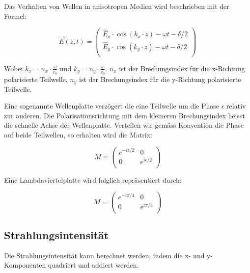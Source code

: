 Das Verhalten von Wellen  in anisotropen Medien wird beschrieben mit der Formel:

\begin{equation}
    \vec{E}(z,t) = \begin{pmatrix}
        \hat{E}_x\cdot\cos(k_x \cdot z) - \omega t - \delta/2 \\
        \hat{E}_y\cdot\cos(k_y \cdot z) - \omega t - \delta/2 \\
    \end{pmatrix}
\end{equation}

Wobei   $k_x   =   n_x   \cdot   \frac{\omega}{c_0}$   und  $k_y  =  n_y   \cdot
\frac{\omega}{c_0}$.   $n_x$   ist   der  Brechungsindex  f\"ur  die  x-Richtung
polarisierte Teilwelle,  $n_y$  ist  der  Brechungsindex  f\"ur  die  y-Richtung
polarisierte Teilwelle.

Eine  sogenannte  Wellenplatte  verz\"ogert  die eine  Teilwelle  um  die  Phase
$\epsilon$ relativ  zur  anderen.  Die  Polarisationsrichtung  mit dem kleineren
Brechungsindex  heisst  die  schnelle  Achse  der  Wellenplatte.  Verteilen  wir
gem\"ass Konvention die Phase auf beide Teilwellen, so erhalten wird die Matrix:

\begin{equation}
    M = \begin{pmatrix}
        e^{-i\epsilon/2} & 0 \\
        0 & e^{ i\epsilon/2} \\
    \end{pmatrix}
\end{equation}

Eine Lambdaviertelplatte wird folglich repr\"asentiert durch:

\begin{equation}
    M = \begin{pmatrix}
        e^{-i\pi/4} & 0 \\
        0 & e^{ i\pi/4} \\
    \end{pmatrix}
\end{equation}


\subsection{Strahlungsintensit\"at}

Die Strahlungsintensit\"at kann berechnet werden, indem die x- und y-Komponenten quadriert und addiert werden.

